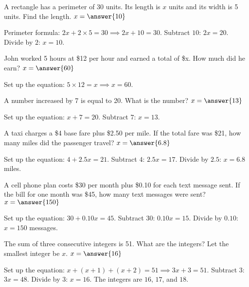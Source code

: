 \documentclass{ximera}
\begin{document}
\begin{problem}
A rectangle has a perimeter of 30 units. Its length is $x$ units and its width is 5 units. Find the length. $x=\answer{10}$
\begin{feedback}
Perimeter formula: $2x + 2 \times 5 = 30 \implies 2x + 10 = 30$. Subtract $10$: $2x = 20$. Divide by $2$: $x = 10$.
\end{feedback}
\end{problem}

\begin{problem}
John worked 5 hours at \$12 per hour and earned a total of \$x. How much did he earn? $x=\answer{60}$
\begin{feedback}
Set up the equation: $5 \times 12 = x \implies x = 60$.
\end{feedback}
\end{problem}

\begin{problem}
A number increased by 7 is equal to 20. What is the number? $x=\answer{13}$
\begin{feedback}
Set up the equation: $x + 7 = 20$. Subtract $7$: $x = 13$.
\end{feedback}
\end{problem}



\begin{problem}
A taxi charges a \$4 base fare plus \$2.50 per mile. If the total fare was \$21, how many miles did the passenger travel? $x=\answer{6.8}$
\begin{feedback}
Set up the equation: $4 + 2.5x = 21$. Subtract $4$: $2.5x = 17$. Divide by $2.5$: $x = 6.8$ miles.
\end{feedback}
\end{problem}

\begin{problem}
A cell phone plan costs \$30 per month plus \$0.10 for each text message sent. If the bill for one month was \$45, how many text messages were sent? $x=\answer{150}$
\begin{feedback}
Set up the equation: $30 + 0.10x = 45$. Subtract $30$: $0.10x = 15$. Divide by $0.10$: $x = 150$ messages.
\end{feedback}
\end{problem}

\begin{problem}
The sum of three consecutive integers is 51. What are the integers? Let the smallest integer be $x$. $x=\answer{16}$
\begin{feedback}
Set up the equation: $x + (x+1) + (x+2) = 51 \implies 3x + 3 = 51$. Subtract $3$: $3x = 48$. Divide by $3$: $x = 16$. The integers are $16$, $17$, and $18$.
\end{feedback}
\end{problem}

\end{document}
